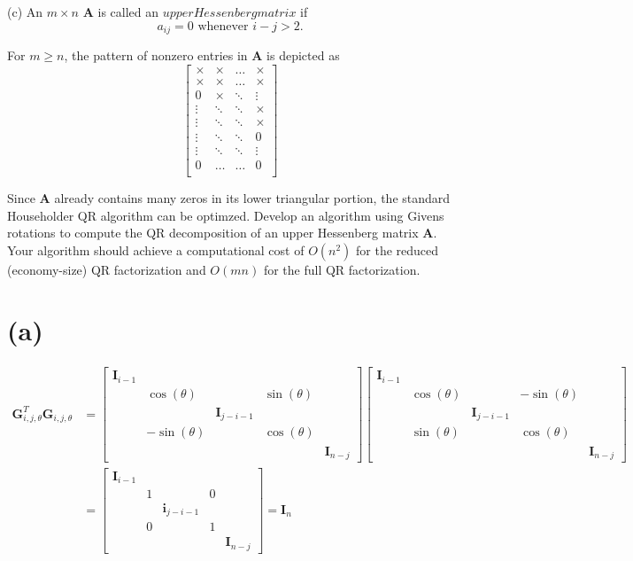 \documentclass{article}
\begin{document}
(c) An \(m \times n\) \(\bm{A}\) is called an \(upper Hessenberg matrix\) if
\[
    a_{ij} = 0 \text{ whenever } i - j > 2.
\]

For \(m \geq n\), the pattern of nonzero entries in \(\bm{A}\) is depicted as
\[
\begin{bmatrix}
    \times & \times & \dots & \times \\
    \times & \times & \dots & \times \\
    0 & \times & \ddots & \vdots \\
    \vdots & \ddots & \ddots & \times \\
    \vdots & \ddots & \ddots & \times \\
    \vdots & \ddots & \ddots & 0 \\
    \vdots & \ddots & \ddots & \vdots \\
    0 & \dots & \dots & 0 \\
\end{bmatrix}
\]

Since \(\bm{A}\) already contains many zeros in its lower triangular portion, the standard Householder QR algorithm can be optimzed.
Develop an algorithm using Givens rotations to compute the QR decomposition of an upper Hessenberg matrix \(\bm{A}\). Your algorithm should achieve a computational cost of \(O(n^2)\) for the reduced (economy-size) QR factorization and \(O(mn)\) for the full QR factorization.


\section*{(a)}
\begin{align*}
    \bm{G}_{i, j, \theta}^T \bm{G}_{i, j, \theta} &=
    \begin{bmatrix}
        \bm{I}_{i-1} &  &  &  &  \\
                     & \cos(\theta) &  & \sin(\theta) & \\
                     & & \bm{I}_{j - i - 1}& & \\
         & -\sin(\theta) && \cos(\theta) &\\
         & &&& \bm{I}_{n-j}
    \end{bmatrix}
    \begin{bmatrix}
        \bm{I}_{i-1} &  &  &  &  \\
                     & \cos(\theta) &  & -\sin(\theta) & \\
                     & & \bm{I}_{j - i - 1}& & \\
         & \sin(\theta) && \cos(\theta) &\\
         & &&& \bm{I}_{n-j}
    \end{bmatrix} \\
    &= 
    \begin{bmatrix}
        \bm{I}_{i-1} &  &  &  &  \\
                     & 1 &  & 0 & \\
                     & & \bm{i}_{j - i - 1}& & \\
         & 0 && 1 &\\
         & &&& \bm{I}_{n-j}
    \end{bmatrix} = \bm{I}_n
\end{align*}
\end{document}
